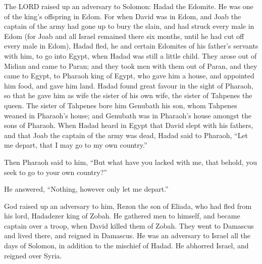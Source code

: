  The LORD raised up an adversary to Solomon: Hadad the
Edomite. He was one of the king's offspring in Edom.  For
when David was in Edom, and Joab the captain of the army had gone up to
bury the slain, and had struck every male in Edom  (for
Joab and all Israel remained there six months, until he had cut off
every male in Edom),  Hadad fled, he and certain Edomites
of his father's servants with him, to go into Egypt, when Hadad was
still a little child.  They arose out of Midian and came to
Paran; and they took men with them out of Paran, and they came to Egypt,
to Pharaoh king of Egypt, who gave him a house, and appointed him food,
and gave him land.  Hadad found great favour in the sight
of Pharaoh, so that he gave him as wife the sister of his own wife, the
sister of Tahpenes the queen.  The sister of Tahpenes bore
him Genubath his son, whom Tahpenes weaned in Pharaoh's house; and
Genubath was in Pharaoh's house amongst the sons of Pharaoh.
 When Hadad heard in Egypt that David slept with his
fathers, and that Joab the captain of the army was dead, Hadad said to
Pharaoh, ``Let me depart, that I may go to my own country.''

 Then Pharaoh said to him, ``But what have you lacked with
me, that behold, you seek to go to your own country?''

He answered, ``Nothing, however only let me depart.''

 God raised up an adversary to him, Rezon the son of
Eliada, who had fled from his lord, Hadadezer king of Zobah.
 He gathered men to himself, and became captain over a
troop, when David killed them of Zobah. They went to Damascus and lived
there, and reigned in Damascus.  He was an adversary to
Israel all the days of Solomon, in addition to the mischief of Hadad. He
abhorred Israel, and reigned over Syria.

